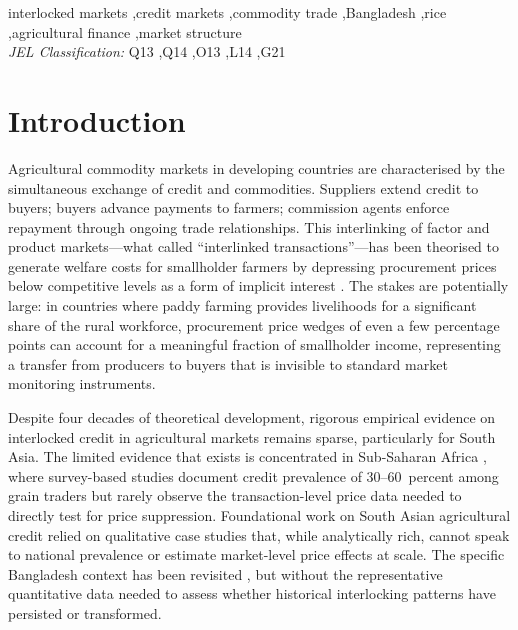 \documentclass[authoryear,preprint,review,12pt]{elsarticle}
\begin{document}
\begin{frontmatter}
\begin{keyword}
interlocked markets \sep credit markets \sep commodity trade \sep Bangladesh
\sep rice \sep agricultural finance \sep market structure \\[3pt]
\textit{JEL Classification:} Q13 \sep Q14 \sep O13 \sep L14 \sep G21
\end{keyword}

\end{frontmatter}

\section{Introduction}
\label{sec:intro}

Agricultural commodity markets in developing countries are characterised
by the simultaneous exchange of credit and commodities. Suppliers extend
credit to buyers; buyers advance payments to farmers; commission agents
enforce repayment through ongoing trade relationships. This interlinking
of factor and product markets---what \citet{bardhan1980} called
``interlinked transactions''---has been theorised to generate welfare costs
for smallholder farmers by depressing procurement prices below competitive
levels as a form of implicit interest \citep{braverman_stiglitz1982}.
The stakes are potentially large: in countries where paddy farming provides
livelihoods for a significant share of the rural workforce, procurement
price wedges of even a few percentage points can account for a meaningful
fraction of smallholder income, representing a transfer from producers to
buyers that is invisible to standard market monitoring instruments.

Despite four decades of theoretical development, rigorous empirical evidence
on interlocked credit in agricultural markets remains sparse, particularly
for South Asia. The limited evidence that exists is concentrated in
Sub-Saharan Africa \citep{fafchamps_minten1999, stephens_barrett2011},
where survey-based studies document credit prevalence of 30--60~percent
among grain traders but rarely observe the transaction-level price data
needed to directly test for price suppression. Foundational work on South
Asian agricultural credit \citep{murshid1992, crow_murshid1994} relied on
qualitative case studies that, while analytically rich, cannot speak to
national prevalence or estimate market-level price effects at scale. The
specific Bangladesh context has been revisited \citep{murshid2015}, but
without the representative quantitative data needed to assess whether
historical interlocking patterns have persisted or transformed.
\end{document}
